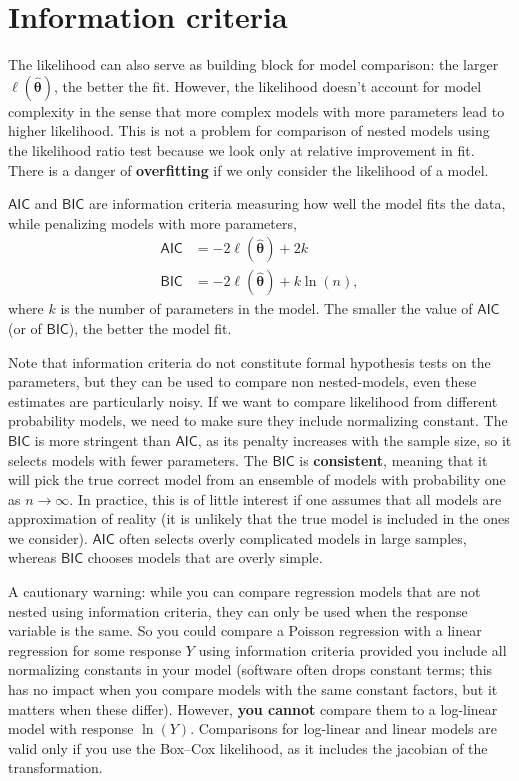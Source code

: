 \documentclass[
  11pt,
  letterpaper,
]{book}
\theoremstyle{definition}
\theoremstyle{definition}
\theoremstyle{definition}
\theoremstyle{definition}
\theoremstyle{remark}
\begin{document}
\hypertarget{information-criteria}{%
\section{Information criteria}\label{information-criteria}}

The likelihood can also serve as building block for model comparison: the larger \(\ell(\boldsymbol{\widehat{\theta}})\), the better the fit. However, the likelihood doesn't account for model complexity in the sense that more complex models with more parameters lead to higher likelihood. This is not a problem for comparison of nested models using the likelihood ratio test because we look only at relative improvement in fit. There is a danger of \textbf{overfitting} if we only consider the likelihood of a model.

\(\mathsf{AIC}\) and \(\mathsf{BIC}\) are information criteria measuring how well the model fits the data, while penalizing models with more parameters,
\begin{align*}
\mathsf{AIC}&=-2\ell(\widehat{\boldsymbol{\theta}})+2k \\
\mathsf{BIC}&=-2\ell(\widehat{\boldsymbol{\theta}})+k\ln(n),
\end{align*}
where \(k\) is the number of parameters in the model. The smaller the value of \(\mathsf{AIC}\) (or of \(\mathsf{BIC}\)), the better the model fit.

Note that information criteria do not constitute formal hypothesis tests on the parameters, but they can be used to compare non nested-models, even these estimates are particularly noisy. If we want to compare likelihood from different probability models, we need to make sure they include normalizing constant. The \(\mathsf{BIC}\) is more stringent than \(\mathsf{AIC}\), as its penalty increases with the sample size, so it selects models with fewer parameters. The \(\mathsf{BIC}\) is \textbf{consistent}, meaning that it will pick the true correct model from an ensemble of models with probability one as \(n \to \infty\). In practice, this is of little interest if one assumes that all models are approximation of reality (it is unlikely that the true model is included in the ones we consider). \(\mathsf{AIC}\) often selects overly complicated models in large samples, whereas \(\mathsf{BIC}\) chooses models that are overly simple.

A cautionary warning: while you can compare regression models that are not nested using information criteria, they can only be used when the response variable is the same. So you could compare a Poisson regression with a linear regression for some response \(Y\) using information criteria provided you include all normalizing constants in your model (software often drops constant terms; this has no impact when you compare models with the same constant factors, but it matters when these differ). However, \textbf{you cannot} compare them to a log-linear model with response \(\ln(Y)\). Comparisons for log-linear and linear models are valid only if you use the Box--Cox likelihood, as it includes the jacobian of the transformation.
\end{document}
